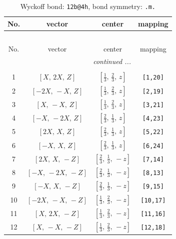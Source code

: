 \documentclass[fleqn,8pt]{jsarticle}
\begin{document}
\begin{longtable}{cccc}
\caption{Wyckoff bond: {\tt 12b@4h}, bond symmetry: {\tt .m.}}
 \\
 \hline \hline
No. & vector & center & mapping \\ \hline \endfirsthead

\multicolumn{3}{l}{\tablename\ \thetable{}} \\
 \hline \hline
No. & vector & center & mapping \\ \hline \endhead

 \hline \hline
\multicolumn{3}{r}{\footnotesize\it continued ...} \\ \endfoot

 \hline \hline
\multicolumn{3}{r}{} \\ \endlastfoot

1 & $\left[ X,\, 2 X,\, Z \right]$ & $\left[ \frac{1}{3},\, \frac{2}{3},\, z \right]$ & {\tt [1,20]} \\ \hline
2 & $\left[ - 2 X,\, - X,\, Z \right]$ & $\left[ \frac{1}{3},\, \frac{2}{3},\, z \right]$ & {\tt [2,19]} \\ \hline
3 & $\left[ X,\, - X,\, Z \right]$ & $\left[ \frac{1}{3},\, \frac{2}{3},\, z \right]$ & {\tt [3,21]} \\ \hline
4 & $\left[ - X,\, - 2 X,\, Z \right]$ & $\left[ \frac{2}{3},\, \frac{1}{3},\, z \right]$ & {\tt [4,23]} \\ \hline
5 & $\left[ 2 X,\, X,\, Z \right]$ & $\left[ \frac{2}{3},\, \frac{1}{3},\, z \right]$ & {\tt [5,22]} \\ \hline
6 & $\left[ - X,\, X,\, Z \right]$ & $\left[ \frac{2}{3},\, \frac{1}{3},\, z \right]$ & {\tt [6,24]} \\ \hline
7 & $\left[ 2 X,\, X,\, - Z \right]$ & $\left[ \frac{2}{3},\, \frac{1}{3},\, - z \right]$ & {\tt [7,14]} \\ \hline
8 & $\left[ - X,\, - 2 X,\, - Z \right]$ & $\left[ \frac{2}{3},\, \frac{1}{3},\, - z \right]$ & {\tt [8,13]} \\ \hline
9 & $\left[ - X,\, X,\, - Z \right]$ & $\left[ \frac{2}{3},\, \frac{1}{3},\, - z \right]$ & {\tt [9,15]} \\ \hline
10 & $\left[ - 2 X,\, - X,\, - Z \right]$ & $\left[ \frac{1}{3},\, \frac{2}{3},\, - z \right]$ & {\tt [10,17]} \\ \hline
11 & $\left[ X,\, 2 X,\, - Z \right]$ & $\left[ \frac{1}{3},\, \frac{2}{3},\, - z \right]$ & {\tt [11,16]} \\ \hline
12 & $\left[ X,\, - X,\, - Z \right]$ & $\left[ \frac{1}{3},\, \frac{2}{3},\, - z \right]$ & {\tt [12,18]} \\
\end{longtable}
\end{document}
